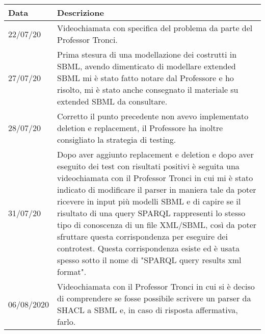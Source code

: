 \documentclass{article}
\begin{document}
\begin{longtable}{p{2cm}p{9cm}}
    \textbf{Data} & \textbf{Descrizione} \\
    \hline
    22/07/20 & Videochiamata con specifica del problema da parte del Professor Tronci. \\
    \hline
    27/07/20 & Prima stesura di una modellazione dei costrutti in SBML, avendo dimenticato di modellare extended SBML mi è stato fatto notare dal Professore e ho risolto, mi è stato anche consegnato il materiale su extended SBML da consultare. \\
    \hline
    28/07/20 & Corretto il punto precedente non avevo implementato deletion e replacement, il Professore ha inoltre consigliato la strategia di testing. \\
    \hline
    31/07/20 & Dopo aver aggiunto replacement e deletion e dopo aver eseguito dei test con risultati positivi è seguita una videochiamata con il Professor Tronci in cui mi è stato indicato di modificare il parser in maniera tale da poter ricevere in input più modelli SBML e di capire se il risultato di una query SPARQL rappresenti lo stesso tipo di conoscenza di un file XML/SBML, così da poter sfruttare questa corrispondenza per eseguire dei controtest. Questa corrispondenza esiste ed è usata spesso sotto il nome di "SPARQL query results xml format". \\
    \hline
    06/08/2020 & Videochiamata con il Professor Tronci in cui si è deciso di comprendere se fosse possibile scrivere un parser da SHACL a SBML e, in caso di risposta affermativa, farlo. \\
    \hline
\end{longtable}

\cleardoublepage
\end{document}

